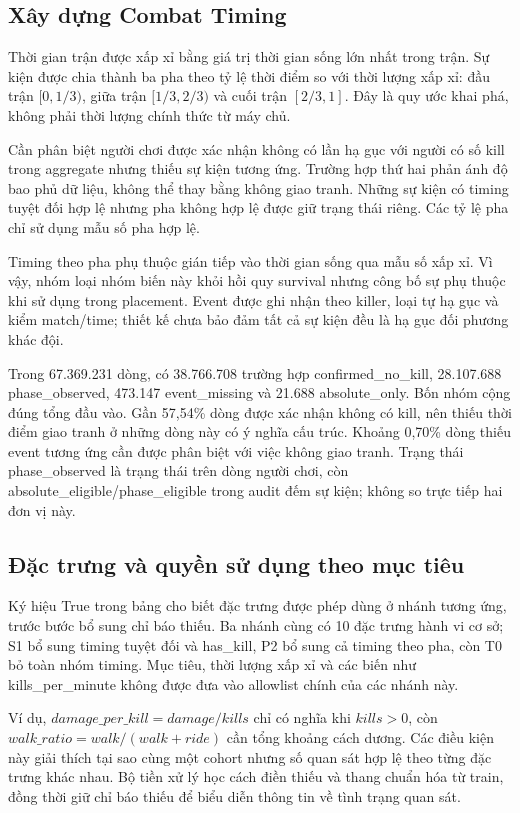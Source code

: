 \documentclass[12pt,a4paper]{article}
\begin{document}
\subsection{Xây dựng Combat Timing}
Thời gian trận được xấp xỉ bằng giá trị thời gian sống lớn nhất trong trận. Sự kiện được chia thành ba pha theo tỷ lệ thời điểm so với thời lượng xấp xỉ: đầu trận $[0,1/3)$, giữa trận $[1/3,2/3)$ và cuối trận $[2/3,1]$. Đây là quy ước khai phá, không phải thời lượng chính thức từ máy chủ.

Cần phân biệt người chơi được xác nhận không có lần hạ gục với người có số kill trong aggregate nhưng thiếu sự kiện tương ứng. Trường hợp thứ hai phản ánh độ bao phủ dữ liệu, không thể thay bằng không giao tranh. Những sự kiện có timing tuyệt đối hợp lệ nhưng pha không hợp lệ được giữ trạng thái riêng. Các tỷ lệ pha chỉ sử dụng mẫu số pha hợp lệ.

Timing theo pha phụ thuộc gián tiếp vào thời gian sống qua mẫu số xấp xỉ. Vì vậy, nhóm loại nhóm biến này khỏi hồi quy survival nhưng công bố sự phụ thuộc khi sử dụng trong placement. Event được ghi nhận theo killer, loại tự hạ gục và kiểm match/time; thiết kế chưa bảo đảm tất cả sự kiện đều là hạ gục đối phương khác đội.

Trong 67.369.231 dòng, có 38.766.708 trường hợp confirmed\_no\_kill, 28.107.688 phase\_observed, 473.147 event\_missing và 21.688 absolute\_only. Bốn nhóm cộng đúng tổng đầu vào. Gần 57,54\% dòng được xác nhận không có kill, nên thiếu thời điểm giao tranh ở những dòng này có ý nghĩa cấu trúc. Khoảng 0,70\% dòng thiếu event tương ứng cần được phân biệt với việc không giao tranh. Trạng thái phase\_observed là trạng thái trên dòng người chơi, còn absolute\_eligible/phase\_eligible trong audit đếm sự kiện; không so trực tiếp hai đơn vị này.

\subsection{Đặc trưng và quyền sử dụng theo mục tiêu}

Ký hiệu True trong bảng cho biết đặc trưng được phép dùng ở nhánh tương ứng, trước bước bổ sung chỉ báo thiếu. Ba nhánh cùng có 10 đặc trưng hành vi cơ sở; S1 bổ sung timing tuyệt đối và has\_kill, P2 bổ sung cả timing theo pha, còn T0 bỏ toàn nhóm timing. Mục tiêu, thời lượng xấp xỉ và các biến như kills\_per\_minute không được đưa vào allowlist chính của các nhánh này.

Ví dụ, $damage\_per\_kill=damage/kills$ chỉ có nghĩa khi $kills>0$, còn $walk\_ratio=walk/(walk+ride)$ cần tổng khoảng cách dương. Các điều kiện này giải thích tại sao cùng một cohort nhưng số quan sát hợp lệ theo từng đặc trưng khác nhau. Bộ tiền xử lý học cách điền thiếu và thang chuẩn hóa từ train, đồng thời giữ chỉ báo thiếu để biểu diễn thông tin về tình trạng quan sát.
\clearpage
\end{document}
